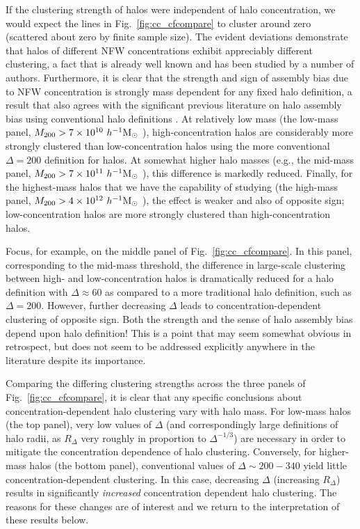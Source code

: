 \documentclass[usenatbib,fleqn]{mnras}
\begin{document}
If the clustering strength of halos were independent of halo concentration, we 
would expect the lines in Fig.~\ref{fig:cc_cfcompare} to cluster around zero (scattered about zero by finite sample size). 
The evident deviations demonstrate that halos of different NFW concentrations exhibit appreciably 
different clustering, a fact that is already well known and has been studied by a number of authors. 
Furthermore, it is clear that the strength and sign of assembly bias due to NFW concentration is 
strongly mass dependent for any fixed halo definition, a result that also agrees with the significant 
previous literature on halo assembly bias using conventional halo definitions 
\citep{wechsler_etal02, gao_etal05, zentner07, wechsler_etal06, harker_etal06, croton_etal07, dalal_etal08, mao_etal15, sunayama_etal16}.
At relatively low mass (the low-mass panel, $M_{200} > 7 \times 10^{10} \ h^{-1}\mathrm{M}_{\odot}~$), 
high-concentration halos are considerably more strongly clustered than low-concentration halos using the more 
conventional $\Delta = 200$ definition for halos. At somewhat higher halo masses 
(e.g., the mid-mass panel, $M_{200} > 7 \times 10^{11} \ h^{-1}\mathrm{M}_{\odot}~$), this difference is markedly reduced. 
Finally, for the highest-mass halos that we have the capability of studying (the high-mass panel, 
$M_{200} > 4 \times 10^{12} \ h^{-1}\mathrm{M}_{\odot}~$), the effect is weaker and also of opposite sign; 
low-concentration halos are more strongly clustered than high-concentration halos.

Focus, for example, on the middle panel of Fig.~\ref{fig:cc_cfcompare}. In this panel, 
corresponding to the mid-mass threshold, the difference in large-scale clustering between 
high- and low-concentration halos is dramatically reduced for a halo definition with 
$\Delta \approx 60$ as compared to a more traditional halo definition, such as $\Delta=200$. 
However, further decreasing $\Delta$ leads to concentration-dependent clustering of opposite sign. 
Both the strength and the sense of halo assembly bias depend upon halo definition! This is a 
point that may seem somewhat obvious in retrospect, but does not seem to be addressed 
explicitly anywhere in the literature despite its importance.


Comparing the differing clustering strengths across the three panels of Fig.~\ref{fig:cc_cfcompare}, 
it is clear that any specific conclusions about concentration-dependent halo clustering 
vary with halo mass. For low-mass halos (the top panel), 
very low values of $\Delta$ (and correspondingly large definitions of halo radii, 
as $R_{\Delta}$ very roughly in proportion to $\Delta^{-1/3}$) are necessary in order 
to mitigate the concentration dependence of halo clustering. Conversely, for higher-mass 
halos (the bottom panel), conventional values of $\Delta \sim 200-340$ yield little 
concentration-dependent clustering. In this case, decreasing $\Delta$ (increasing $R_{\Delta}$) 
results in significantly {\em increased} concentration dependent halo clustering. The reasons for 
these changes are of interest and we return to the interpretation of these results below.
\end{document}
